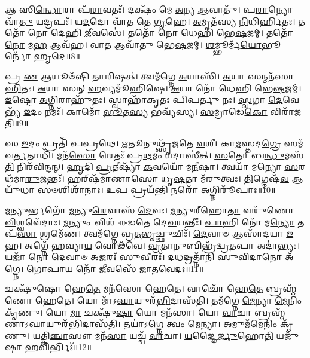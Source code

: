 𑌆 𑌸𑌿\-\ul{𑌨𑍍𑌧𑍋}\-𑌰𑌾 𑌪᳴\-\ul{𑌰𑌾}\-𑌵𑌤𑌃᳴।
𑌦𑌕𑍍𑌷𑌂᳴ 𑌮𑍇 \ul{𑌅}\-𑌨𑍍𑌯 \ul{𑌆}\-𑌵𑌾𑌤𑍁᳴।
𑌪\-\ul{𑌰𑌾}\-𑌨𑍍𑌯𑍋 𑌵𑌾᳴\-\ul{𑌤𑍁} 𑌯𑌦𑍍𑌰𑌪𑌃᳴।
𑌯\-\ul{𑌦}\-𑌦𑍋 𑌵𑌾᳴𑌤 𑌤𑍇 \ul{𑌗𑍃}\-𑌹𑍇।
\-\ul{𑌅}\-𑌮𑍃𑌤᳴𑌸𑍍𑌯 \ul{𑌨𑌿}\-𑌧𑌿𑌰𑍍\mbox{}\-\ul{𑌹𑌿}\-𑌤𑌃।
𑌤𑌤𑍋᳴ 𑌨𑍋 𑌦𑍇𑌹𑌿 \ul{𑌜𑍀}\-𑌵𑌸𑍇॑।
𑌤𑌤𑍋᳴ 𑌨𑍋 𑌧𑍇𑌹𑌿 𑌭𑍇\-\ul{𑌷}\-𑌜𑌮𑍍।
𑌤𑌤𑍋᳴ \ul{𑌨𑍋} 𑌮\-\ul{𑌹} 𑌆𑌵᳴𑌹।
𑌵𑌾\-\ul{𑌤} 𑌆𑌵𑌾᳴𑌤𑍁 𑌭𑍇\-\ul{𑌷}\-𑌜𑌮𑍍।
\-\ul{𑌶}\-𑌮𑍍𑌭𑍂𑌰𑍍𑌮᳴\-\ul{𑌯𑍋}\-𑌭𑍂𑌰𑍍𑌨𑍋᳴ \ul{𑌹𑍃}\-𑌦𑍇॥8॥

𑌪𑍍𑌰 \ul{𑌣} 𑌆𑌯𑍂𑍞᳴𑌷𑌿 𑌤𑌾𑌰𑌿𑌷𑌤𑍍।
𑌤𑍍𑌵𑌮᳴𑌗𑍍𑌨𑍇 \ul{𑌅}\-𑌯𑌾𑌸𑌿᳴।
\-\ul{𑌅}\-𑌯𑌾 𑌸𑌨𑍍𑌮𑌨᳴𑌸𑌾 \ul{𑌹𑌿}\-𑌤𑌃।
\-\ul{𑌅}\-𑌯𑌾 𑌸𑌨𑍍 \ul{𑌹}\-𑌵𑍍𑌯𑌮𑍂᳴𑌹𑌿𑌷𑍇।
\-\ul{𑌅}\-𑌯𑌾 𑌨𑍋᳴ 𑌧𑍇𑌹𑌿 𑌭𑍇\-\ul{𑌷}\-𑌜𑌮𑍍।
\-\ul{𑌇}\-𑌷𑍍𑌟𑍋 \ul{𑌅}\-𑌗𑍍𑌨𑌿𑌰𑌾𑌹𑍁᳴𑌤𑌃।
𑌸𑍍𑌵𑌾𑌹𑌾᳴𑌕𑍃𑌤𑌃 𑌪𑌿𑌪𑌰𑍍𑌤𑍁 𑌨𑌃।
\-\ul{𑌸𑍍𑌵}\-𑌗𑌾 \ul{𑌦𑍇}\-𑌵𑍇𑌭𑍍𑌯᳴ \ul{𑌇}\-𑌦𑌂 𑌨𑌮𑌃᳴।
𑌕𑌾𑌮𑍋᳴ \ul{𑌭𑍂}\-𑌤\-\ul{𑌸𑍍𑌯} 𑌭𑌵𑍍𑌯᳴𑌸𑍍𑌯।
\-\ul{𑌸}\-𑌮𑍍𑌰𑌾𑌡𑍇\-\ul{𑌕𑍋} 𑌵𑌿𑌰𑌾᳴𑌜𑌤𑌿॥9॥

𑌸 \ul{𑌇}\-𑌦𑌂 𑌪𑍍𑌰𑌤𑌿᳴ 𑌪𑌪𑍍𑌰𑌥𑍇।
\-\ul{𑌋}\-𑌤𑍂𑌨𑍁𑌥𑍍𑌸𑍃᳴𑌜𑌤𑍇 \ul{𑌵}\-𑌶𑍀।
𑌕𑌾\-\ul{𑌮}\-𑌸𑍍𑌤𑌦\-\ul{𑌗𑍍𑌰𑍇} 𑌸𑌮᳴𑌵\-\ul{𑌰𑍍𑌤}\-𑌤𑌾𑌧𑌿᳴।
𑌮𑌨᳴\-\ul{𑌸𑍋} 𑌰𑍇𑌤𑌃᳴ 𑌪𑍍𑌰\-\ul{𑌥}\-𑌮𑌂 𑌯𑌦𑌾𑌸𑍀॑𑌤𑍍।
\-\ul{𑌸}\-𑌤𑍋 𑌬\-\ul{𑌨𑍍𑌧𑍁}\-𑌮𑌸᳴\-\ul{𑌤𑌿} 𑌨𑌿𑌰᳴𑌵𑌿𑌨𑍍𑌦𑌨𑍍।
\-\ul{𑌹𑍃}\-𑌦𑌿 \ul{𑌪𑍍𑌰}\-𑌤𑍀𑌷𑍍𑌯𑌾᳴ \ul{𑌕}\-𑌵𑌯𑍋᳴ 𑌮\-\ul{𑌨𑍀}\-𑌷𑌾।
𑌤𑍍𑌵𑌯𑌾᳴ 𑌮𑌨𑍍𑌯𑍋 \ul{𑌸}\-𑌰𑌥᳴𑌮𑌾\-\ul{𑌰𑍁}\-𑌜𑌨𑍍𑌤𑌃᳴।
𑌹𑌰𑍍‌\mbox{}𑌷᳴𑌮𑌾𑌣𑌾𑌸𑍋 𑌧𑍃\-\ul{𑌷}\-𑌤𑌾 𑌮᳴𑌰𑍁𑌤𑍍𑌵𑌃।
\-\ul{𑌤𑌿}\-𑌗𑍍𑌮𑍇𑌷᳴\-\ul{𑌵} 𑌆𑌯𑍁᳴𑌧𑌾 \ul{𑌸}\-\-\ul{𑍞}\-𑌶𑌿𑌶𑌾᳴𑌨𑌾𑌃।
𑌉\-\ul{𑌪} 𑌪𑍍𑌰𑌯᳴\-\ul{𑌨𑍍𑌤𑌿} 𑌨𑌰𑍋᳴ \ul{𑌅}\-𑌗𑍍𑌨𑌿𑌰𑍂᳴𑌪𑌾𑌃॥10॥

\-\ul{𑌮}\-𑌨𑍍𑌯𑍁𑌰𑍍𑌭𑌗𑍋᳴ \ul{𑌮}\-𑌨𑍍𑌯𑍁\-\ul{𑌰𑍇}\-𑌵𑌾𑌸᳴ \ul{𑌦𑍇}\-𑌵𑌃।
\-\ul{𑌮}\-𑌨𑍍𑌯𑍁𑌰𑍍‌\mbox{}𑌹𑍋\-\ul{𑌤𑌾} 𑌵𑌰𑍁᳴𑌣𑍋 \ul{𑌵𑌿}\-𑌶𑍍𑌵𑌵𑍇᳴𑌦𑌾𑌃।
\-\ul{𑌮}\-𑌨𑍍𑌯𑍁𑌂 𑌵𑌿𑌶᳴ 𑌈𑌡𑌤𑍇 𑌦𑍇\-\ul{𑌵}\-𑌯𑌨𑍍𑌤𑍀𑌃॑।
\-\ul{𑌪𑌾}\-𑌹𑌿 𑌨𑍋᳴ 𑌮\-\ul{𑌨𑍍𑌯𑍋} 𑌤𑌪᳴\-\ul{𑌸𑌾} 𑌶𑍍𑌰𑌮𑍇᳴𑌣।
𑌤𑍍𑌵𑌮᳴𑌗𑍍𑌨𑍇 𑌵𑍍𑌰\-\ul{𑌤}\-𑌭𑍃𑌚𑍍𑌛𑍁𑌚𑌿𑌃᳴।
\-\ul{𑌦𑍇}\-𑌵𑌾𑍞 𑌆𑌸𑌾᳴𑌦𑌯𑌾 \ul{𑌇}\-𑌹।
𑌅𑌗𑍍𑌨𑍇᳴ \ul{𑌹}\-𑌵𑍍𑌯𑌾\-\ul{𑌯} 𑌵𑍋𑌢᳴𑌵𑍇।
\-\ul{𑌵𑍍𑌰}\-𑌤𑌾𑌨𑍁𑌬𑌿𑌭𑍍𑌰᳴𑌦𑍍𑌵𑍍𑌰\-\ul{𑌤}\-𑌪𑌾 𑌅𑌦𑌾॑𑌭𑍍𑌯𑌃।
𑌯𑌜𑌾᳴ 𑌨𑍋 \ul{𑌦𑍇}\-𑌵𑌾𑍞 \ul{𑌅}\-𑌜𑌰𑌃᳴ \ul{𑌸𑍁}\-𑌵𑍀𑌰𑌃᳴।
𑌦\-\ul{𑌧}\-𑌦𑍍𑌰𑌤𑍍𑌨𑌾᳴𑌨𑌿 𑌸𑍁𑌵𑌿\-\ul{𑌦𑌾}\-𑌨𑍋 𑌅᳴𑌗𑍍𑌨𑍇।
\-\ul{𑌗𑍋}\-\-\ul{𑌪𑌾}\-𑌯 𑌨𑍋᳴ \ul{𑌜𑍀}\-𑌵𑌸𑍇᳴ 𑌜𑌾𑌤𑌵𑍇𑌦𑌃॥11॥\anuvakamend[𑌜𑌿𑌘𑌾𑍞᳴𑌸\-\ul{𑌤𑍍𑌯}\-𑌮𑌿𑌤𑍍𑌰𑌾॑𑌞𑍍𑌜\-\ul{𑌘}\-𑌨𑍍𑌵𑌾𑌨𑍀᳴𑌡\-\ul{𑌤𑍇} 𑌸\-\ul{𑌰𑍍𑌵𑌾} 𑌅𑍞𑌹᳴𑌸𑍋 𑌵𑌾𑌤𑍋 \ul{𑌹𑍃}\-𑌦𑍇 𑌰𑌾᳴𑌜\-\ul{𑌤𑍍𑌯}\-𑌗𑍍𑌨𑌿𑌰𑍂᳴𑌪𑌾𑌃 𑌸𑍁𑌵𑌿\-\ul{𑌦𑌾}\-𑌨𑍋 𑌅᳴\-\ul{𑌗𑍍𑌨} 𑌏𑌕𑌂᳴ 𑌚]

𑌚𑌕𑍍𑌷𑍁᳴𑌷𑍋 𑌹𑍇\-\ul{𑌤𑍇} 𑌮𑌨᳴𑌸𑍋 𑌹𑍇𑌤𑍇।
𑌵𑌾𑌚𑍋᳴ 𑌹𑍇\-\ul{𑌤𑍇} 𑌬𑍍𑌰𑌹𑍍𑌮᳴𑌣𑍋 𑌹𑍇𑌤𑍇।
𑌯𑍋 𑌮𑌾᳴\-𑌽\-\ul{𑌘𑌾}\-𑌯𑍁𑌰᳴\-\ul{𑌭𑌿}\-𑌦𑌾𑌸᳴𑌤𑌿।
𑌤𑌮᳴𑌗𑍍𑌨𑍇 \ul{𑌮𑍇}\-𑌨𑍍𑌯𑌾 \ul{𑌮𑍇}\-𑌨𑌿𑌂 𑌕𑍃᳴𑌣𑍁।
𑌯𑍋 \ul{𑌮𑌾} 𑌚𑌕𑍍𑌷𑍁᳴\-\ul{𑌷𑌾} 𑌯𑍋 𑌮𑌨᳴𑌸𑌾।
𑌯𑍋 \ul{𑌵𑌾}\-𑌚𑌾 𑌬𑍍𑌰𑌹𑍍𑌮᳴𑌣𑌾\-𑌽\-\ul{𑌘𑌾}\-𑌯𑍁𑌰᳴\-\ul{𑌭𑌿}\-𑌦𑌾𑌸᳴𑌤𑌿।
𑌤𑌯𑌾॑𑌽\-\ul{𑌗𑍍𑌨𑍇} 𑌤𑍍𑌵𑌂 \ul{𑌮𑍇}\-𑌨𑍍𑌯𑌾।
\-\ul{𑌅}\-𑌮𑍁𑌮᳴\-\ul{𑌮𑍇}\-𑌨𑌿𑌂 𑌕𑍃᳴𑌣𑍁।
𑌯𑌤𑍍𑌕𑌿\-\ul{𑌞𑍍𑌚𑌾}\-𑌸𑍗 𑌮𑌨᳴\-\ul{𑌸𑌾} 𑌯𑌚𑍍𑌚᳴ \ul{𑌵𑌾}\-𑌚𑌾।
\-\ul{𑌯}\-𑌜𑍍𑌞𑍈\-\ul{𑌰𑍍𑌜𑍁}\-𑌹𑍋\-\ul{𑌤𑌿} 𑌯𑌜𑍁᳴𑌷𑌾 \ul{𑌹}\-𑌵𑌿𑌰𑍍𑌭𑌿𑌃᳴॥12॥

